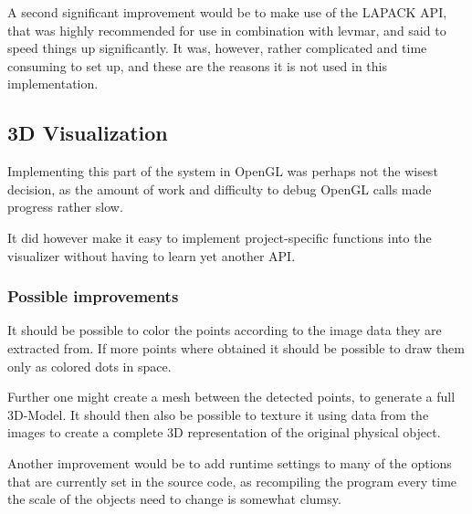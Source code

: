 A second significant improvement would be to make use of the LAPACK API, that was highly recommended for use in combination with levmar, and said to speed things up significantly. It was, however, rather complicated and time consuming to set up, and these are the reasons it is not used in this implementation.

\subsection{3D Visualization}
Implementing this part of the system in OpenGL was perhaps not the wisest decision, as the amount of work and difficulty to debug OpenGL calls made progress rather slow.

It did however make it easy to implement project-specific functions into the visualizer without having to learn yet another API.

\subsubsection{Possible improvements}
It should be possible to color the points according to the image data they are extracted from. If more points where obtained it should be possible to draw them only as colored dots in space.

Further one might create a mesh between the detected points, to generate a full 3D-Model. It should then also be possible to texture it using data from the images to create a complete 3D representation of the original physical object.

Another improvement would be to add runtime settings to many of the options that are currently set in the source code, as recompiling the program every time the scale of the objects need to change is somewhat clumsy.
